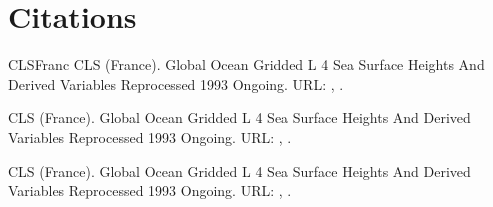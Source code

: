 \documentclass[letterpaper,10pt,english]{jupyterBook}
\begin{document}
\part{Citations}
\label{\detokenize{notebooks/regional_and_local/SL_Trend:citations}}
\begin{sphinxthebibliography}{CLSFranc}
\sphinxAtStartPar
CLS (France). Global Ocean Gridded L 4 Sea Surface Heights And Derived Variables Reprocessed 1993 Ongoing. URL: , .

\sphinxAtStartPar
CLS (France). Global Ocean Gridded L 4 Sea Surface Heights And Derived Variables Reprocessed 1993 Ongoing. URL: , .

\sphinxAtStartPar
CLS (France). Global Ocean Gridded L 4 Sea Surface Heights And Derived Variables Reprocessed 1993 Ongoing. URL: , .
\end{sphinxthebibliography}







\renewcommand{\indexname}{Index}
\printindex
\end{document}

